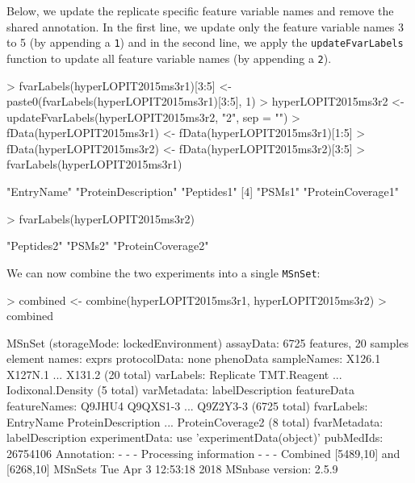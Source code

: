 Below, we update the replicate specific feature variable names and
remove the shared annotation. In the first line, we update only the
feature variable names 3 to 5 (by appending a \texttt{1}) and in the
second line, we apply the \texttt{updateFvarLabels} function to update
all feature variable names (by appending a \texttt{2}).

\begin{Schunk}
\begin{Sinput}
> fvarLabels(hyperLOPIT2015ms3r1)[3:5] <- paste0(fvarLabels(hyperLOPIT2015ms3r1)[3:5], 1)
> hyperLOPIT2015ms3r2 <- updateFvarLabels(hyperLOPIT2015ms3r2, "2", sep = "")
> fData(hyperLOPIT2015ms3r1) <- fData(hyperLOPIT2015ms3r1)[1:5]
> fData(hyperLOPIT2015ms3r2) <- fData(hyperLOPIT2015ms3r2)[3:5]
> fvarLabels(hyperLOPIT2015ms3r1)
\end{Sinput}
\begin{Soutput}
[1] "EntryName"          "ProteinDescription" "Peptides1"         
[4] "PSMs1"              "ProteinCoverage1"  
\end{Soutput}
\begin{Sinput}
> fvarLabels(hyperLOPIT2015ms3r2)
\end{Sinput}
\begin{Soutput}
[1] "Peptides2"        "PSMs2"            "ProteinCoverage2"
\end{Soutput}
\end{Schunk}

We can now combine the two experiments into a single \texttt{MSnSet}:

\begin{Schunk}
\begin{Sinput}
> combined <- combine(hyperLOPIT2015ms3r1, hyperLOPIT2015ms3r2)
> combined
\end{Sinput}
\begin{Soutput}
MSnSet (storageMode: lockedEnvironment)
assayData: 6725 features, 20 samples 
  element names: exprs 
protocolData: none
phenoData
  sampleNames: X126.1 X127N.1 ... X131.2 (20 total)
  varLabels: Replicate TMT.Reagent ... Iodixonal.Density (5 total)
  varMetadata: labelDescription
featureData
  featureNames: Q9JHU4 Q9QXS1-3 ... Q9Z2Y3-3 (6725 total)
  fvarLabels: EntryName ProteinDescription ... ProteinCoverage2 (8
    total)
  fvarMetadata: labelDescription
experimentData: use 'experimentData(object)'
  pubMedIds: 26754106 
Annotation:  
- - - Processing information - - -
Combined [5489,10] and [6268,10] MSnSets Tue Apr  3 12:53:18 2018 
 MSnbase version: 2.5.9 
\end{Soutput}
\end{Schunk}

